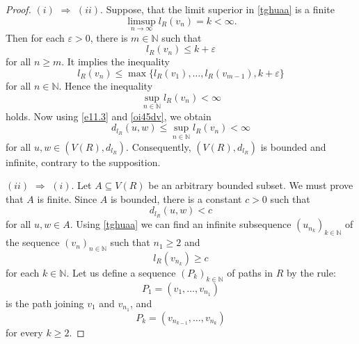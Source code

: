 \documentclass[pdflatex,sn-mathphys-num]{sn-jnl}%
\theoremstyle{thmstyletwo}%
\begin{document}
\begin{proof}

$ (i)$ $\Rightarrow$ $(ii)$. %
Suppose, that the limit superior in \eqref{tghuaa} is a finite %
\begin{equation}
\limsup_{n \to \infty} l_R(v_n) = k < \infty.
\end{equation}
Then for each $\varepsilon > 0$, there is $m \in \mathbb{N}$ such that  
\begin{equation*}
l_R(v_n) \leq k + \varepsilon 
\end{equation*}
for all $n \geq m.$ It implies the inequality  
\begin{equation*}
l_R(v_n) \leq \max\{l_R(v_1), \ldots, l_R(v_{m-1}), k + \varepsilon\}
\end{equation*}
for all $n \in \mathbb{N}$. Hence the inequality
\begin{equation}\label{oi45dv}
\sup_{n \in \mathbb{N}} l_R(v_n) < \infty
\end{equation}
holds. Now using \eqref{e11.3} and \eqref{oi45dv}, we obtain
\begin{equation*}
d_{l_R}(u, w) \leq \sup_{n \in \mathbb{N}} l_R(v_n) < \infty
\end{equation*}
for all $u, w \in (V(R),d_{l_R})$. Consequently, $(V(R),d_{l_R})$ is bounded and infinite, contrary to the supposition.

$(ii)$ $\Rightarrow$ $(i)$. %
Let $A \subseteq V(R)$ be an arbitrary bounded subset.
We must prove that $A$ is finite.
Since $A$ is bounded, there is a constant $c > 0$ such that
\begin{equation}\label{jtfdqw11}
d_{l_R}(u, w) < c 
\end{equation}
for all $u, w \in A$. Using \eqref{tghuaa} we can find an infinite subsequence $(u_{n_k})_{k \in \mathbb{N}}$ of the sequence $(v_n)_{n \in \mathbb{N}}$ such that $n_1 \geq 2$ and
\begin{equation}\label{onhwer12}
l_R(v_{n_k}) \geq c
\end{equation}
for each $k \in \mathbb{N}$. Let us define a sequence $(P_k)_{k \in \mathbb{N}}$ of paths in $R$ by the rule: 
\begin{equation*}
P_1= (v_1, \ldots, v_{n_1})
\end{equation*}
is
the path joining $v_1$ and $v_{n_1}$, and 
\begin{equation*}
P_k = (v_{n_{k-1}}, \ldots, v_{n_k})
\end{equation*}
for every $k \geq 2$.


\end{proof}
\end{document}
